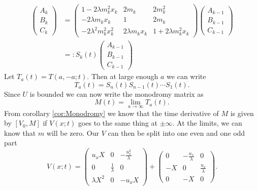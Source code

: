 \documentclass[english,master]{liumaiex}
\theoremstyle{plain}
\theoremstyle{definition}
\begin{document}
\begin{equation}
\begin{aligned}
\begin{pmatrix} A_k \\ B_k \\ C_k \end{pmatrix} &= 
\begin{pmatrix}
	1 - 2\lambda m_k^2 x_k & 2m_k & 2m_k^2 \\
	-2\lambda m_k x_k & 1 & 2m_k \\
	-2\lambda^2 m_k^2 x_k^2 & 2\lambda m_k x_k & 1 + 2\lambda m_k^2 x_k
\end{pmatrix}
\begin{pmatrix} A_{k-1} \\ B_{k-1} \\ C_{k-1} \end{pmatrix} \\
&=: S_k(t) 
\begin{pmatrix} A_{k-1} \\ B_{k-1} \\ C_{k-1} \end{pmatrix}
\end{aligned}
\end{equation}
Let $T_a(t) = T(a,-a;t)$. Then at large enough $a$ we can write 
\begin{equation}
	T_a(t) = S_n(t)S_{n-1}(t) \cdots S_1(t).
\end{equation}
Since $U$ is bounded we can now write the monodromy matrix as
\begin{equation}
	M(t) = \lim_{a \rightarrow \infty} T_a(t).
\end{equation}
From corollary \ref{cor:Monodromy} we know that the time derivative of $M$ is given by $[V_0, M]$ if $V(x;t)$ goes to the same thing at $\pm \infty$. At the limits, we can know that $m$ will be zero. Our $V$ can then be split into one even and one odd part
\begin{equation}
	V(x;t) =
\begin{pmatrix}
	u_x X & 0 & -\frac{u_x^2}{\lambda} \\
	0 & \frac{1}{\lambda} & 0 \\
	\lambda X^2 & 0 & -u_x X
\end{pmatrix} +
\begin{pmatrix}
	0  & -\frac{u_x}{\lambda} & 0 \\
	-X & 0 & \frac{u_x}{\lambda} \\
	0 & -X & 0
\end{pmatrix}.
\end{equation}
\end{document}
